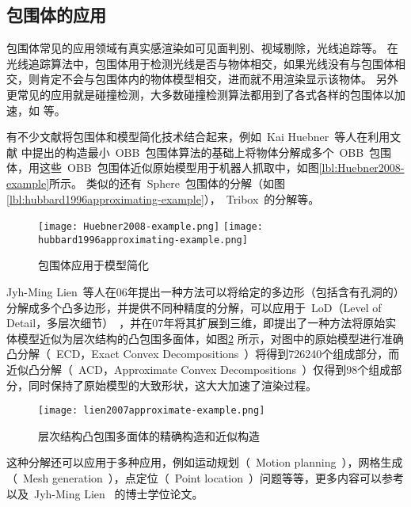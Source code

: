 \subsection{包围体的应用}

包围体常见的应用领域有真实感渲染如可见面判别、视域剔除\cite{assarsson2000optimized}，光线追踪\cite{wald2007ray}等。
在光线追踪算法中，包围体用于检测光线是否与物体相交，如果光线没有与包围体相交，则肯定不会与包围体内的物体模型相交，进而就不用渲染显示该物体。
另外更常见的应用就是碰撞检测\cite{wangzhiqiang1999}，大多数碰撞检测算法都用到了各式各样的包围体以加速，如
 等。

有不少文献将包围体和模型简化技术结合起来，例如~Kai Huebner~等人\cite{huebner2008minimum}在利用文献
中提出的构造最小~OBB~包围体算法的基础上将物体分解成多个~OBB~包围体，用这些~OBB~包围体近似原始模型用于机器人抓取中，如图\ref{lbl:Huebner2008-example}所示。
类似的还有~Sphere~包围体的分解\cite{hubbard1996approximating}（如图\ref{lbl:hubbard1996approximating-example}），~Tribox~的分解\cite{crosnier1999tribox}等。

\begin{figure}[H]
  \centering
    {\texttt{[image: Huebner2008-example.png]}}
    {\texttt{[image: hubbard1996approximating-example.png]}}
  \caption{包围体应用于模型简化}
  \label{lbl:bounding-voluems-used-in-shape-approximation}
\end{figure}

Jyh-Ming Lien~\cite{lien2006approximate2d}等人在06年提出一种方法可以将给定的多边形（包括含有孔洞的）分解成多个凸多边形，并提供不同种精度的分解，可以应用于~LoD（Level of
Detail，多层次细节）~，并在07年将其扩展到三维\cite{lien2007approximate3d}，即提出了一种方法将原始实体模型近似为层次结构的凸包围多面体，如图\ref{lbl:lien2007approximate-example}
所示，对图中的原始模型进行准确凸分解（~ECD，Exact Convex
Decompositions~）将得到726240个组成部分，而近似凸分解（~ACD，Approximate Convex
Decompositions~）仅得到98个组成部分，同时保持了原始模型的大致形状，这大大加速了渲染过程。

\begin{figure}[H]
\centering
\texttt{[image: lien2007approximate-example.png]}
\caption{层次结构凸包围多面体的精确构造和近似构造\cite{lien2007approximate3d}}
\label{lbl:lien2007approximate-example}
\end{figure}
这种分解还可以应用于多种应用，例如运动规划（~Motion planning~），网格生成（~Mesh generation~），点定位（~Point location~）问题等等，更多内容可以参考\cite{lien2008approximate} 以及~Jyh-Ming Lien~ 的博士学位论文\cite{lien2006approximatephd}。


